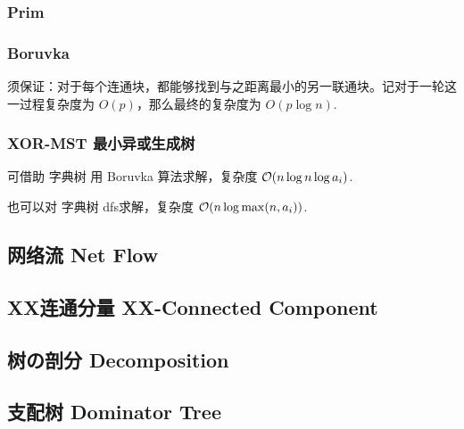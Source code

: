 
\subsubsection{Prim}


\subsubsection{Boruvka}

须保证：对于每个连通块，都能够找到与之距离最小的另一联通块。记对于一轮这一过程复杂度为 $O(p)$，那么最终的复杂度为 $O(p \log n)$. 

\subsubsection{XOR-MST 最小异或生成树}

可借助 字典树 用 Boruvka 算法求解，复杂度 $\mathcal{O}(n \log n \log a_i)$.

也可以对 字典树 dfs求解，复杂度 $\mathcal{O}(n \log \max(n, a_i))$.


\subsection{网络流 Net Flow}


\subsection{XX连通分量 XX-Connected Component}




\subsection{树の剖分 Decomposition}


\subsection{支配树 Dominator Tree}

